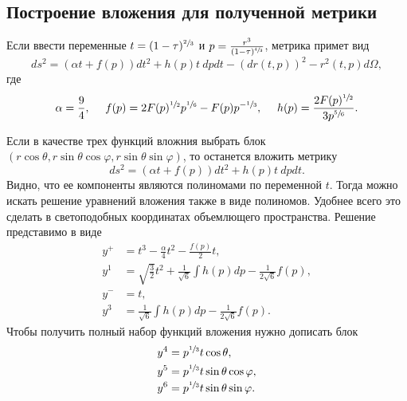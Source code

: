 \documentclass[12pt]{article}
\newcommand{\bq}{\begin{equation}}
\newcommand{\eq}{\end{equation}}
\begin{document}


\subsection{Построение вложения для полученной метрики}

Если ввести переменные $t = (1-\tau)^{\sfrac{2}{3}}$ и $p = \frac{r^3}{(1-\tau)^{\sfrac{4}{3}}}$, метрика примет вид
\bq
	d s^2 = \left(\alpha t +f(p) \right) dt^2 + h(p) t \ dp dt - \left(dr(t,p)\right)^2 - r^2(t,p) d \Omega,
\eq
где
\[
\alpha = \frac{9}{4},\ \ \ \  f(p) = 2 F(p)^{\sfrac{1}{2}} p^{\sfrac{1}{6}} - F(p) p^{-\sfrac{1}{3}}, \ \ \ \  h(p) = \frac{2F(p)^{\sfrac{1}{2}}}{3p^{\sfrac{5}{6}}}.
\]

Если в качестве трех функций вложния выбрать блок $(r \cos{\theta},r \sin{\theta}\cos{\varphi},r \sin{\theta}\sin{\varphi})$, то останется вложить метрику
\bq
	d s^2 = \left(\alpha t +f(p) \right) dt^2 + h(p) t \ dp dt.
\eq
Видно, что ее компоненты являются полиномами по переменной $t$. Тогда можно искать решение уравнений вложения также в виде полиномов. Удобнее всего это сделать в светоподобных координатах объемлющего пространства. Решение представимо в виде
\begin{align}
	y^{+} &= t^3 - \frac{\alpha}{4}t^2-\frac{f(p)}{2}t, \\
	y^1 &= \sqrt{\frac{3}{2}}t^2 + \frac{1}{\sqrt{6}}\int h(p)dp - \frac{1}{2\sqrt{6}}f(p), \\
	y^{-} &= t, \\
	y^{3} &= \frac{1}{\sqrt{6}}\int h(p)dp - \frac{1}{2\sqrt{6}}f(p).
\end{align}
Чтобы получить полный набор функций вложения нужно дописать блок
\begin{align}
	y^4 &= p^{\sfrac{1}{3}}t \cos{\theta}, \\
	y^5 &= p^{\sfrac{1}{3}}t \sin{\theta} \cos{\varphi}, \\
	y^6 &= p^{\sfrac{1}{3}}t\sin{\theta} \sin{\varphi}.
\end{align}
\end{document}
